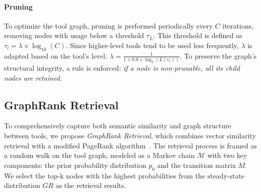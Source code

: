 \paragraph{Pruning} 
To optimize the tool graph, pruning is performed periodically every $C$ iterations, removing nodes with usage below a threshold $\tau_L$. This threshold is defined as $\tau_l = \lambda \times \log_{10}(C)$. Since higher-level tools tend to be used less frequently, $\lambda$ is adapted based on the tool's level: $\lambda = \frac{1}{1 + 0.8 \times \log_2(L(v_i))}$. To preserve the graph's structural integrity, a rule is enforced: \textit{if a node is non-prunable, all its child nodes are retained}.
\subsection{GraphRank Retrieval}
\label{subsec:graphrank}
To comprehensively capture both semantic similarity and graph structure between tools, we propose \textit{GraphRank Retrieval}, which combines vector similarity retrieval with a modified PageRank algorithm~\citep{xing2004weighted}.
The retrieval process is framed as a random walk on the tool graph, modeled as a Markov chain $\mathcal{M}$ with two key components: the prior probability distribution $p_0$ and the transition matrix $M$. We select the top-k nodes with the highest probabilities from the steady-state distribution $GR$ as the retrieval results.

